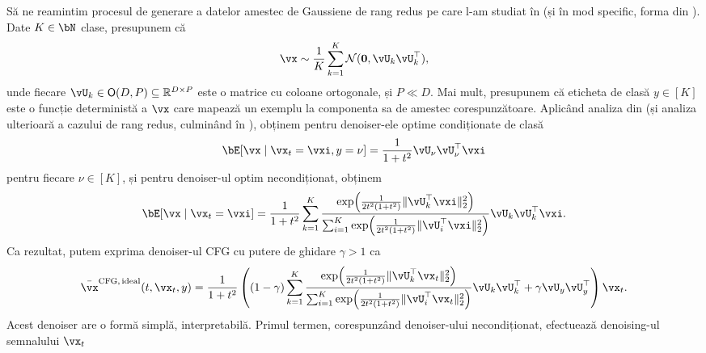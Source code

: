 \documentclass[../../book-main_ro.tex]{subfiles}
\begin{document}
\begin{example}\label{example:denoising-gaussian-mixture-cfg}
  Să ne reamintim procesul de generare a datelor amestec de Gaussiene de rang redus pe care l-am studiat în
   (și în mod specific, forma din
  ). Date $K \in \bN$ clase, presupunem că
  \begin{equation}\label{eq:MoG1-ch6}
    \vx \sim \frac{1}{K}\sum_{k = 1}^{K}\dNorm(\vzero, \vU_{k}\vU_{k}^{\top}),
  \end{equation}
  unde fiecare \(\vU_{k} \in \O(D, P) \subseteq \R^{D \times P}\) este o matrice cu
  coloane ortogonale, și $P \ll D$.
  Mai mult, presupunem că eticheta de clasă $y \in [K]$ este o funcție deterministă
  a $\vx$ care mapează un exemplu la componenta sa de amestec corespunzătoare.
  Aplicând analiza din  (și
  analiza ulterioară a cazului de rang redus, culminând în
  ), obținem pentru denoiser-ele optime
  condiționate de clasă
  \begin{equation}\label{eq:gmm_lowrank_denoiser-ch6-classcond}
    \bE[ \vx \mid \vx_t = \vxi, y = \nu ]
    = \frac{1}{1 + t^{2}}
    \vU_{\nu}\vU_{\nu}^{\top}\vxi
  \end{equation}
  pentru fiecare $\nu \in [K]$, și pentru denoiser-ul optim necondiționat, obținem
  \begin{equation}\label{eq:gmm_lowrank_denoiser-ch6-uncond}
    \bE[ \vx \mid \vx_t = \vxi ]
    = \frac{1}{1 + t^{2}}\sum_{k = 1}^{K}\frac{\exp\rp{\frac{1}{2t^{2}(1 + t^{2})}\norm{\vU_{k}^{\top}\vxi}_{2}^{2}}}{\sum_{i = 1}^{K}\exp\rp{\frac{1}{2t^{2}(1 + t^{2})}\norm{\vU_{i}^{\top}\vxi}_{2}^{2}}}\vU_{k}\vU_{k}^{\top}\vxi.
  \end{equation}
  Ca rezultat, putem exprima denoiser-ul CFG cu putere de ghidare $\gamma
  > 1$ ca
  \begin{equation}\label{eq:cfg-denoiser-mog-low-rank}
    \bar{\vx}^{\mathrm{CFG,\,ideal}}(t, \vx_t, y)
    =
    \frac{1}{1 + t^{2}}
    \left(
    (1 - \gamma) 
    \sum_{k = 1}^{K}\frac{\exp\rp{\frac{1}{2t^{2}(1
    + t^{2})}\norm{\vU_{k}^{\top}\vx_t}_{2}^{2}}}{\sum_{i
    = 1}^{K}\exp\rp{\frac{1}{2t^{2}(1
    + t^{2})}\norm{\vU_{i}^{\top}\vx_t}_{2}^{2}}}\vU_{k}\vU_{k}^{\top}
    +
    \gamma 
    \vU_{y}\vU_{y}^{\top}
    \right)
    \vx_t.
  \end{equation}
  Acest denoiser are o formă simplă, interpretabilă. Primul termen, corespunzând
  denoiser-ului necondiționat, efectuează denoising-ul semnalului $\vx_t$

\end{example}
\end{document}

